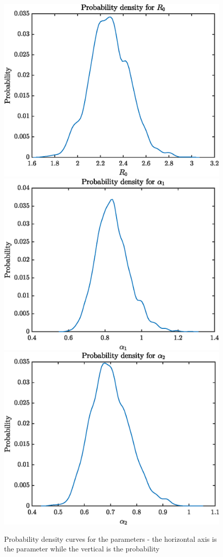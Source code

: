\documentclass{X:/Documents/Coding/Latex/myassignment}
\begin{document}
\begin{figure}[tb]
	\centering
	\includegraphics[width=0.45\linewidth]{Probdensity1.eps}
	\includegraphics[width=0.45\linewidth]{Probdensity2.eps}
	\includegraphics[width=0.45\linewidth]{Probdensity3.eps}
	\caption{Probability density curves for the parameters - the horizontal axis is the parameter while the vertical is the probability}
	\label{fig:density}
\end{figure}



\appendix

\printbibliography
\end{document}
